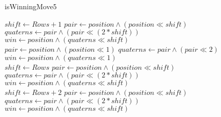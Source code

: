 \documentclass[a4paper]{article}
\begin{document}
\begin{algorithm}
  \caption{isWinningMove5} 
  \begin{algorithmic}
      \State $shift \gets Rows + 1$
      \State $pair \gets position \land (position \ll shift)$
      \State $quaterns \gets pair \land (pair \ll (2 * shift))$
      \State $win \gets position \land (quaterns \ll shift)$
        \State {}
      \EndIf
      \\
      \State $pair \gets position \land (position \ll 1)$
      \State $quaterns \gets pair \land (pair \ll 2)$
      \State $win \gets position \land (quaterns \ll 1)$
        \State {}
      \EndIf
      \\
      \State $shift \gets Rows$
      \State $pair \gets position \land (position \ll shift)$
      \State $quaterns \gets pair \land (pair \ll (2 * shift))$
      \State $win \gets position \land (quaterns \ll shift)$
        \State {}
      \EndIf
      \\
      \State $shift \gets Rows + 2$
      \State $pair \gets position \land (position \ll shift)$
      \State $quaterns \gets pair \land (pair \ll (2 * shift))$
      \State $win \gets position \land (quaterns \ll shift)$
        \State {}
      \EndIf
      \\
      \State {}
    \EndFunction
  \end{algorithmic}
\end{algorithm}
\end{document}
